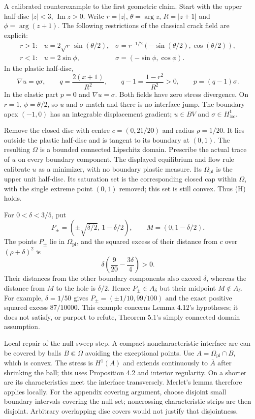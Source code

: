 \documentclass[10pt]{article}
\begin{document}
A calibrated counterexample to the first geometric claim. Start with the upper half-disc \(|z|<3\), \(\operatorname{Im}z>0\). Write \(r=|z|\), \(\theta=\arg z\), \(R=|z+1|\) and \(\phi=\arg(z+1)\). The following restrictions of the classical crack field are explicit: \[\begin{array}{lll}
r>1:&u=2\sqrt r\,\sin(\theta/2),&
 \sigma=r^{-1/2}(-\sin(\theta/2),\cos(\theta/2)),\\[2pt]
r<1:&u=2\sin\phi,&
 \sigma=(-\sin\phi,\cos\phi).
\end{array}\] In the plastic half-disc, \[\nabla u=q\sigma,\qquad
 q=\frac{2(x+1)}{R^2},\qquad
 q-1=\frac{1-r^2}{R^2}>0,\qquad p=(q-1)\sigma.\] In the elastic part \(p=0\) and \(\nabla u=\sigma\). Both fields have zero stress divergence. On \(r=1\), \(\phi=\theta/2\), so \(u\) and \(\sigma\) match and there is no interface jump. The boundary apex \((-1,0)\) has an integrable displacement gradient; \(u\in BV\) and \(\sigma\in H^1_{\mathrm{loc}}\).\par
Remove the closed disc with centre \(c=(0,21/20)\) and radius \(\rho=1/20\). It lies outside the plastic half-disc and is tangent to its boundary at \((0,1)\). The resulting \(\Omega\) is a bounded connected Lipschitz domain. Prescribe the actual trace of \(u\) on every boundary component. The displayed equilibrium and flow rule calibrate \(u\) as a minimizer, with no boundary plastic measure. Its \(\Omega_{\mathrm{pl}}\) is the upper unit half-disc. Its saturation set is the corresponding closed cap within \(\Omega\), with the single extreme point \((0,1)\) removed; this set is still convex. Thus (H) holds.\par
For \(0<\delta<3/5\), put \[P_\pm=(\pm\sqrt{\delta/2},\,1-\delta/2),\qquad
 M=(0,1-\delta/2).\] The points \(P_\pm\) lie in \(\Omega_{\mathrm{pl}}\), and the squared excess of their distance from \(c\) over \((\rho+\delta)^2\) is \[\delta\left(\frac9{20}-\frac{3\delta}{4}\right)>0.\] Their distances from the other boundary components also exceed \(\delta\), whereas the distance from \(M\) to the hole is \(\delta/2\). Hence \(P_\pm\in A_\delta\) but their midpoint \(M\notin A_\delta\). For example, \(\delta=1/50\) gives \(P_\pm=(\pm1/10,99/100)\) and the exact positive squared excess \(87/10000\). This example concerns Lemma 4.12’s hypotheses; it does not satisfy, or purport to refute, Theorem 5.1’s simply connected domain assumption.\par
Local repair of the null-sweep step. A compact noncharacteristic interface arc can be covered by balls \(B\Subset\Omega\) avoiding the exceptional points. Use \(A=\Omega_{\mathrm{pl}}\cap B\), which is convex. The stress is \(H^1(A)\) and extends continuously to \(\overline A\) after shrinking the ball; this uses Proposition 4.2 and interior regularity. On a shorter arc its characteristics meet the interface transversely. Merlet’s lemma therefore applies locally. For the appendix covering argument, choose disjoint small boundary intervals covering the null set; noncrossing characteristic strips are then disjoint. Arbitrary overlapping disc covers would not justify that disjointness.\par
\end{document}
